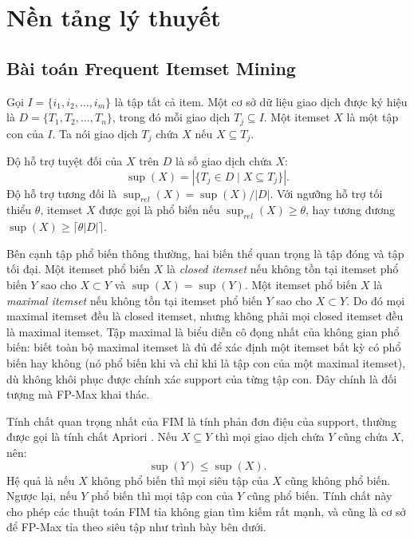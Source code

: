 \section{Nền tảng lý thuyết}
\label{sec:theory}

\subsection{Bài toán Frequent Itemset Mining}

Gọi $I = \{i_1, i_2, \ldots, i_m\}$ là tập tất cả item. Một cơ sở dữ liệu giao dịch được ký hiệu là $D = \{T_1, T_2, \ldots, T_n\}$, trong đó mỗi giao dịch $T_j \subseteq I$. Một itemset $X$ là một tập con của $I$. Ta nói giao dịch $T_j$ chứa $X$ nếu $X \subseteq T_j$.

Độ hỗ trợ tuyệt đối của $X$ trên $D$ là số giao dịch chứa $X$:
\[
    \operatorname{sup}(X) = |\{T_j \in D \mid X \subseteq T_j\}|.
\]
Độ hỗ trợ tương đối là $\operatorname{sup}_{rel}(X) = \operatorname{sup}(X) / |D|$. Với ngưỡng hỗ trợ tối thiểu $\theta$, itemset $X$ được gọi là phổ biến nếu $\operatorname{sup}_{rel}(X) \geq \theta$, hay tương đương $\operatorname{sup}(X) \geq \lceil \theta |D| \rceil$.

Bên cạnh tập phổ biến thông thường, hai biến thể quan trọng là tập đóng và tập tối đại. Một itemset phổ biến $X$ là \textit{closed itemset} nếu không tồn tại itemset phổ biến $Y$ sao cho $X \subset Y$ và $\operatorname{sup}(X) = \operatorname{sup}(Y)$. Một itemset phổ biến $X$ là \textit{maximal itemset} nếu không tồn tại itemset phổ biến $Y$ sao cho $X \subset Y$. Do đó mọi maximal itemset đều là closed itemset, nhưng không phải mọi closed itemset đều là maximal itemset. Tập maximal là biểu diễn cô đọng nhất của không gian phổ biến: biết toàn bộ maximal itemset là đủ để xác định một itemset bất kỳ có phổ biến hay không (nó phổ biến khi và chỉ khi là tập con của một maximal itemset), dù không khôi phục được chính xác support của từng tập con. Đây chính là đối tượng mà FP-Max khai thác.

Tính chất quan trọng nhất của FIM là tính phản đơn điệu của support, thường được gọi là tính chất Apriori \cite{Agrawal1993AssociationRules}. Nếu $X \subseteq Y$ thì mọi giao dịch chứa $Y$ cũng chứa $X$, nên:
\[
    \operatorname{sup}(Y) \leq \operatorname{sup}(X).
\]
Hệ quả là nếu $X$ không phổ biến thì mọi siêu tập của $X$ cũng không phổ biến. Ngược lại, nếu $Y$ phổ biến thì mọi tập con của $Y$ cũng phổ biến. Tính chất này cho phép các thuật toán FIM tỉa không gian tìm kiếm rất mạnh, và cũng là cơ sở để FP-Max tỉa theo siêu tập như trình bày bên dưới.


